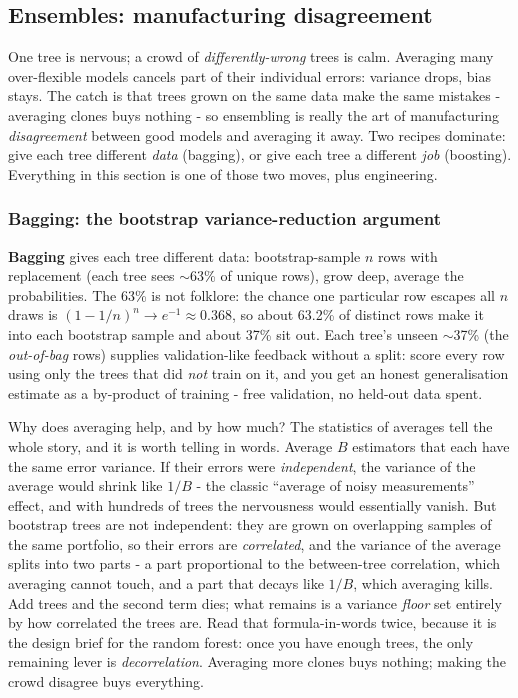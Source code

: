 \documentclass[11pt,a4paper]{article}
\begin{document}
\subsection{Ensembles: manufacturing disagreement}
One tree is nervous; a crowd of \emph{differently-wrong} trees is calm.
Averaging many over-flexible models cancels part of their individual
errors: variance drops, bias stays. The catch is that trees grown on the
same data make the same mistakes - averaging clones buys nothing - so
ensembling is really the art of manufacturing \emph{disagreement} between
good models and averaging it away. Two recipes dominate: give each tree
different \emph{data} (bagging), or give each tree a different
\emph{job} (boosting). Everything in this section is one of those two
moves, plus engineering.

\subsubsection{Bagging: the bootstrap variance-reduction argument}
\textbf{Bagging} gives each tree different data: bootstrap-sample $n$ rows
with replacement (each tree sees $\sim$63\% of unique rows), grow deep,
average the probabilities. The 63\% is not folklore: the chance one
particular row escapes all $n$ draws is $(1 - 1/n)^n \to e^{-1}
\approx 0.368$, so about 63.2\% of distinct rows make it into each
bootstrap sample and about 37\% sit out. Each tree's unseen $\sim$37\%
(the \emph{out-of-bag} rows) supplies validation-like feedback without a
split: score every row using only the trees that did \emph{not} train
on it, and you get an honest generalisation estimate as a by-product
of training - free validation, no held-out data spent.

Why does averaging help, and by how much? The statistics of averages
tell the whole story, and it is worth telling in words. Average $B$
estimators that each have the same error variance. If their errors
were \emph{independent}, the variance of the average would shrink like
$1/B$ - the classic ``average of noisy measurements'' effect, and
with hundreds of trees the nervousness would essentially vanish. But
bootstrap trees are not independent: they are grown on overlapping
samples of the same portfolio, so their errors are \emph{correlated},
and the variance of the average splits into two parts - a part
proportional to the between-tree correlation, which averaging cannot
touch, and a part that decays like $1/B$, which averaging kills. Add
trees and the second term dies; what remains is a variance
\emph{floor} set entirely by how correlated the trees are. Read that
formula-in-words twice, because it is the design brief for the random
forest: once you have enough trees, the only remaining lever is
\emph{decorrelation}. Averaging more clones buys nothing; making the
crowd disagree buys everything.
\end{document}
